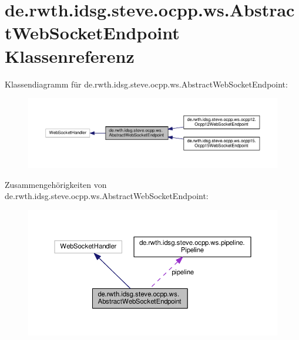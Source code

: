 \hypertarget{classde_1_1rwth_1_1idsg_1_1steve_1_1ocpp_1_1ws_1_1_abstract_web_socket_endpoint}{\section{de.\+rwth.\+idsg.\+steve.\+ocpp.\+ws.\+Abstract\+Web\+Socket\+Endpoint Klassenreferenz}
\label{classde_1_1rwth_1_1idsg_1_1steve_1_1ocpp_1_1ws_1_1_abstract_web_socket_endpoint}
}


Klassendiagramm für de.\+rwth.\+idsg.\+steve.\+ocpp.\+ws.\+Abstract\+Web\+Socket\+Endpoint\+:\nopagebreak
\begin{figure}[H]
\begin{center}
\leavevmode
\includegraphics[width=350pt]{classde_1_1rwth_1_1idsg_1_1steve_1_1ocpp_1_1ws_1_1_abstract_web_socket_endpoint__inherit__graph}
\end{center}
\end{figure}


Zusammengehörigkeiten von de.\+rwth.\+idsg.\+steve.\+ocpp.\+ws.\+Abstract\+Web\+Socket\+Endpoint\+:\nopagebreak
\begin{figure}[H]
\begin{center}
\leavevmode
\includegraphics[width=350pt]{classde_1_1rwth_1_1idsg_1_1steve_1_1ocpp_1_1ws_1_1_abstract_web_socket_endpoint__coll__graph}
\end{center}
\end{figure}
